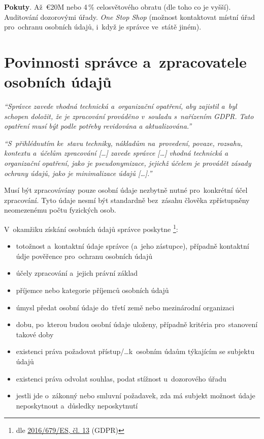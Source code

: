 \textbf{Pokuty}. Až~€20M nebo 4\,\% celosvětového obratu (dle toho co je vyšší). Auditování dozorovými úřady. \emph{One Stop Shop} (možnost kontaktovat místní úřad pro~ochranu osobních údajů, i~když je správce ve~státě jiném).

\clearpage
\section{Povinnosti správce a~zpracovatele osobních údajů}
\label{question-7}

\emph{\enquote{Správce zavede vhodná technická a~organizační opatření, aby zajistil a~byl schopen doložit, že je zpracování prováděno v~souladu s~nařízením GDPR. Tato opatření musí být podle potřeby revidována a aktualizována.}}

\emph{\enquote{S~přihlédnutím ke~stavu techniky, nákladům na~provedení, povaze, rozsahu, kontextu a~účelům zpracování [\dots] zavede správce [\dots] vhodná technická a organizační opatření, jako je pseudonymizace, jejichž účelem je provádět zásady ochrany údajů, jako je minimalizace údajů [\dots].}}

Musí být zpracovávány pouze osobní údaje nezbytně nutné pro~konkrétní účel zpracování. Tyto údaje nesmí být standardně bez~zásahu člověka zpřístupněny neomezenému počtu fyzických osob.

\vspace*{1em}

V~okamžiku získání osobních údajů správce poskytne%
\footnote{%
	dle \href{https://eur-lex.europa.eu/legal-content/CS/TXT/HTML/?uri=CELEX:32016R0679\#d1e2243-1-1}{2016/679/ES, čl. 13} (GDPR)%
}:

\begin{itemize}
\item totožnost a~kontaktní údaje správce (a~jeho zástupce), případně kontaktní údje pověřence pro~ochranu osobních údajů
\item účely zpracování a~jejich právní základ
\item příjemce nebo kategorie příjemců osobních údajů
\item úmysl předat osobní údaje do~třetí země nebo mezinárodní organizaci
\item dobu, po~kterou budou osobní údaje uloženy, případně kritéria pro~stanovení takové doby
\item existenci práva požadovat přístup/\dots k~osobním údaům týkajícím se subjektu údajů
\item existenci práva odvolat souhlas, podat stížnost u~dozorového úřadu
\item jestli jde o~zákonný nebo smluvní požadavek, zda má subjekt možnost údaje neposkytnout a~důsledky neposkytnutí
\end{itemize}

